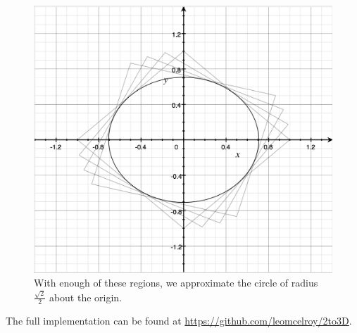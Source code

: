 \begin{figure}[H] 
\includegraphics[width=\linewidth]{dist3.png}
\caption{With enough of these regions, we approximate the circle of radius $\frac{\sqrt{2}}{2}$ about the origin.}
\label{dist3}
\end{figure}

The full implementation can be found at \url{https://github.com/leomcelroy/2to3D}.

